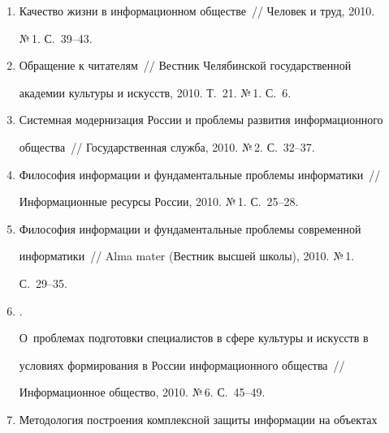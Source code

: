 \begin{enumerate}[1.]
Информационная культура и качество жизни в информационном 


обществе~/\!\!/  Открытое образование, 2010. №\,6. С.~84--89.


\item {}


Качество жизни в информационном обществе~/\!\!/  Человек и труд, 2010. 


№\,1. С.~39--43.


\item {}


Обращение к читателям~/\!\!/  Вестник Челябинской государственной 


академии культуры и искусств, 2010. Т.~21. №\,1. С.~6.


\item {}


Системная модернизация России и проблемы развития информационного 


общества~/\!\!/  Государственная служба, 2010. №\,2. С.~32--37.


\item {}


Философия информации и фундаментальные проблемы информатики~/\!\!/  


Информационные ресурсы России, 2010. №\,1. С.~25--28.


\item {}


Философия информации и фундаментальные проблемы современной 


информатики~/\!\!/ Alma mater (Вестник высшей школы), 2010. №\,1. 


С.~29--35.





\item {}.


 О~проблемах подготовки специалистов в сфере культуры и искусств в 


условиях формирования в России информационного общества~/\!\!/  


Информационное общество, 2010. №\,6. С.~45--49.





\item {}


Методология построения комплексной защиты информации на объектах 



\end{enumerate}
